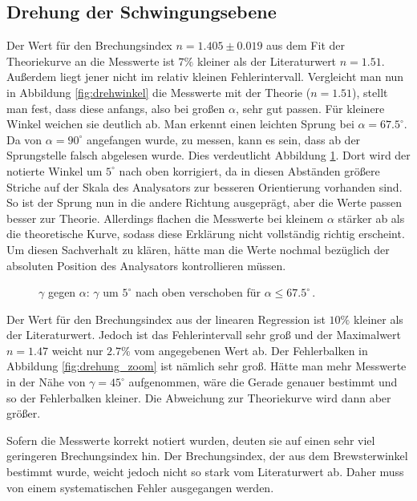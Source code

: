 \documentclass[12pt,a4paper,titlepage,headinclude,bibtotoc]{scrartcl}
\begin{document}
\subsection{Drehung der Schwingungsebene}
Der Wert für den Brechungsindex $n=1.405 \pm 0.019$ aus dem Fit der Theoriekurve an die Messwerte ist $7\%$ kleiner als der Literaturwert $n=1.51$.
Außerdem  liegt jener nicht im relativ kleinen Fehlerintervall.
Vergleicht man nun in Abbildung \ref{fig:drehwinkel} die Messwerte mit der Theorie ($n=1.51$), stellt man fest, dass diese anfangs, also bei großen $\alpha$, sehr gut passen.
Für kleinere Winkel weichen sie deutlich ab.
Man erkennt einen leichten Sprung bei $\alpha=67.5^\circ$.
Da von $\alpha=90^\circ$ angefangen wurde, zu messen, kann es sein, dass ab der Sprungstelle falsch abgelesen wurde.
Dies verdeutlicht Abbildung \ref{fig:drehung2}.
Dort wird der notierte Winkel um $5^\circ$ nach oben korrigiert, da in diesen Abständen größere Striche auf der Skala des Analysators zur besseren Orientierung vorhanden sind.
So ist der Sprung nun in die andere Richtung ausgeprägt, aber die Werte passen besser zur Theorie.
Allerdings flachen die Messwerte bei kleinem $\alpha$ stärker ab als die theoretische Kurve, sodass diese Erklärung nicht vollständig richtig erscheint.
Um diesen Sachverhalt zu klären, hätte man die Werte nochmal bezüglich der absoluten Position des Analysators kontrollieren müssen.
\begin{figure}[!htb]
	\centering
	
	\caption{$\gamma$ gegen $\alpha$: $\gamma$ um $5^\circ$ nach oben verschoben für $\alpha \leq 67.5^\circ\,$.}
	\label{fig:drehung2}
\end{figure}

Der Wert für den Brechungsindex aus der linearen Regression ist $10\%$ kleiner als der Literaturwert.
Jedoch ist das Fehlerintervall sehr groß und der Maximalwert $n=1.47$ weicht nur $2.7\%$ vom angegebenen Wert ab.
Der Fehlerbalken in Abbildung \ref{fig:drehung_zoom} ist nämlich sehr groß.
Hätte man mehr Messwerte in der Nähe von $\gamma=45^\circ$ aufgenommen, wäre die Gerade genauer bestimmt und so der Fehlerbalken kleiner.
Die Abweichung zur Theoriekurve wird dann aber größer.

Sofern die Messwerte korrekt notiert wurden, deuten sie auf einen sehr viel geringeren Brechungsindex hin.
Der Brechungsindex, der aus dem Brewsterwinkel bestimmt wurde, weicht jedoch nicht so stark vom Literaturwert ab.
Daher muss von einem systematischen Fehler ausgegangen werden.
\end{document}
